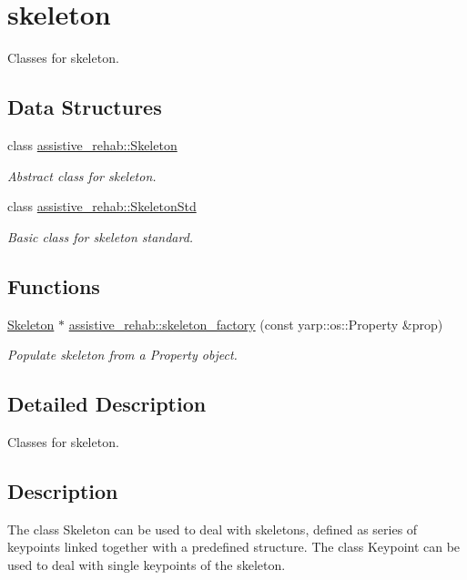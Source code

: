 \section{skeleton}
\label{group__skeleton}


Classes for skeleton.  


\subsection*{Data Structures}
\begin{DoxyCompactItemize}
\item 
class \hyperlink{classassistive__rehab_1_1Skeleton}{assistive\+\_\+rehab\+::\+Skeleton}
\begin{DoxyCompactList}\small\item\em Abstract class for skeleton. \end{DoxyCompactList}\item 
class \hyperlink{classassistive__rehab_1_1SkeletonStd}{assistive\+\_\+rehab\+::\+Skeleton\+Std}
\begin{DoxyCompactList}\small\item\em Basic class for skeleton standard. \end{DoxyCompactList}\end{DoxyCompactItemize}
\subsection*{Functions}
\begin{DoxyCompactItemize}
\item 
\hyperlink{classassistive__rehab_1_1Skeleton}{Skeleton} $\ast$ \hyperlink{group__skeleton_gafe9fe27bb8b50a0843b93dfbb5c571b1}{assistive\+\_\+rehab\+::skeleton\+\_\+factory} (const yarp\+::os\+::\+Property \&prop)
\begin{DoxyCompactList}\small\item\em Populate skeleton from a Property object. \end{DoxyCompactList}\end{DoxyCompactItemize}


\subsection{Detailed Description}
Classes for skeleton. 

\hypertarget{group__skeletonViewer_intro_sec}{}\subsection{Description}\label{group__skeletonViewer_intro_sec}
The class Skeleton can be used to deal with skeletons, defined as series of keypoints linked together with a predefined structure. The class Keypoint can be used to deal with single keypoints of the skeleton.

